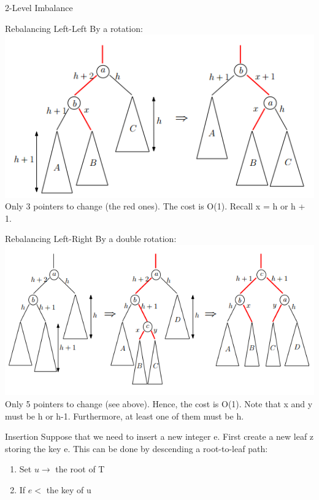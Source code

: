 \documentclass{lecture}
\begin{document}
\begin{landscape}
\begin{multicols}{2}
\begin{note}{2-Level Imbalance}
    \end{note}
    \vfill
    \begin{note}{Rebalancing Left-Left}
        By a rotation:\\
        \includegraphics[width=\linewidth]{leftleft}
        Only 3 pointers to change (the red ones). The cost is O(1). Recall x = h or h + 1.
    \end{note}
    \vfill
    \begin{note}{Rebalancing Left-Right}
        By a double rotation:\\
        \includegraphics[width=\linewidth]{leftright}
        Only 5 pointers to change (see above). Hence, the cost is O(1). Note that x and y must be h or h-1. Furthermore, at least one of them must be h.
    \end{note}
    \vfill
    \begin{note}{Insertion}
        Suppose that we need to insert a new integer e. First create a new leaf z storing the key e. This can be done by descending a root-to-leaf path:
        \begin{enumerate}[nolistsep]
            \item Set $u\rightarrow$ the root of T
            \item If $e<$ the key of u

\end{enumerate}
\end{note}
\end{multicols}
\end{landscape}
\end{document}
